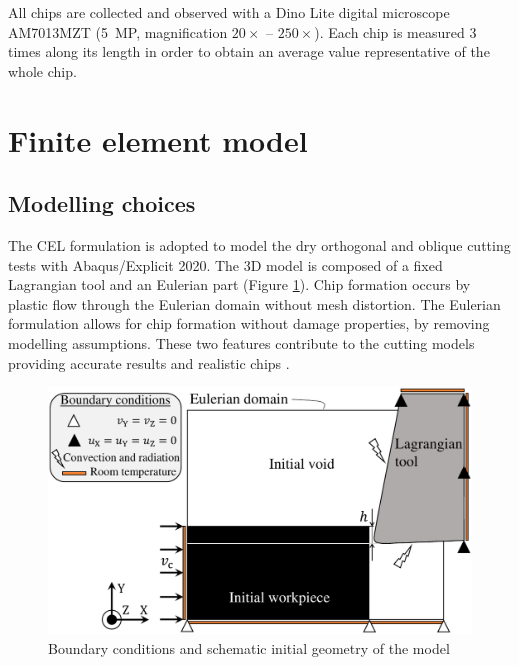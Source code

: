 \documentclass[preprint,12pt,times]{elsarticle}
\begin{document}
All chips are collected and observed with a Dino Lite digital microscope AM7013MZT (5~MP, magnification $20\times$ -- $250\times$). Each chip is measured 3 times along its length in order to obtain an average value representative of the whole chip.

\section{Finite element model}
\label{FEM}

\subsection{Modelling choices}

The CEL formulation is adopted to model the dry orthogonal and oblique cutting tests with Abaqus/Explicit 2020. The 3D model is composed of a fixed Lagrangian tool and an Eulerian part (Figure \ref{fig:BC}). Chip formation occurs by plastic flow through the Eulerian domain without mesh distortion. The Eulerian formulation allows for chip formation without damage properties, by removing modelling assumptions. These two features contribute to the cutting models providing accurate results and realistic chips \cite{ducobu_Application_2016}.

\begin{figure}[!h]
\centering
\includegraphics[width = 140 mm]{Figures/BC} %
\caption{Boundary conditions and schematic initial geometry of the model}
\label{fig:BC}
\end{figure}
\end{document}
